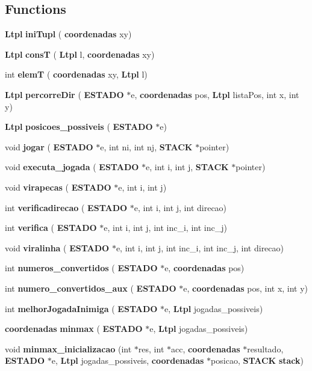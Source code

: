 \subsection*{Functions}
\begin{DoxyCompactItemize}
\item 
\textbf{ Ltpl} \textbf{ ini\+Tupl} (\textbf{ coordenadas} xy)
\item 
\textbf{ Ltpl} \textbf{ consT} (\textbf{ Ltpl} l, \textbf{ coordenadas} xy)
\item 
int \textbf{ elemT} (\textbf{ coordenadas} xy, \textbf{ Ltpl} l)
\item 
\textbf{ Ltpl} \textbf{ percorre\+Dir} (\textbf{ E\+S\+T\+A\+DO} $\ast$e, \textbf{ coordenadas} pos, \textbf{ Ltpl} lista\+Pos, int x, int y)
\item 
\textbf{ Ltpl} \textbf{ posicoes\+\_\+possiveis} (\textbf{ E\+S\+T\+A\+DO} $\ast$e)
\item 
void \textbf{ jogar} (\textbf{ E\+S\+T\+A\+DO} $\ast$e, int ni, int nj, \textbf{ S\+T\+A\+CK} $\ast$pointer)
\item 
void \textbf{ executa\+\_\+jogada} (\textbf{ E\+S\+T\+A\+DO} $\ast$e, int i, int j, \textbf{ S\+T\+A\+CK} $\ast$pointer)
\item 
void \textbf{ virapecas} (\textbf{ E\+S\+T\+A\+DO} $\ast$e, int i, int j)
\item 
int \textbf{ verificadirecao} (\textbf{ E\+S\+T\+A\+DO} $\ast$e, int i, int j, int direcao)
\item 
int \textbf{ verifica} (\textbf{ E\+S\+T\+A\+DO} $\ast$e, int i, int j, int inc\+\_\+i, int inc\+\_\+j)
\item 
void \textbf{ viralinha} (\textbf{ E\+S\+T\+A\+DO} $\ast$e, int i, int j, int inc\+\_\+i, int inc\+\_\+j, int direcao)
\item 
int \textbf{ numeros\+\_\+convertidos} (\textbf{ E\+S\+T\+A\+DO} $\ast$e, \textbf{ coordenadas} pos)
\item 
int \textbf{ numero\+\_\+convertidos\+\_\+aux} (\textbf{ E\+S\+T\+A\+DO} $\ast$e, \textbf{ coordenadas} pos, int x, int y)
\item 
int \textbf{ melhor\+Jogada\+Inimiga} (\textbf{ E\+S\+T\+A\+DO} $\ast$e, \textbf{ Ltpl} jogadas\+\_\+possiveis)
\item 
\textbf{ coordenadas} \textbf{ minmax} (\textbf{ E\+S\+T\+A\+DO} $\ast$e, \textbf{ Ltpl} jogadas\+\_\+possiveis)
\item 
void \textbf{ minmax\+\_\+inicializacao} (int $\ast$res, int $\ast$acc, \textbf{ coordenadas} $\ast$resultado, \textbf{ E\+S\+T\+A\+DO} $\ast$e, \textbf{ Ltpl} jogadas\+\_\+possiveis, \textbf{ coordenadas} $\ast$posicao, \textbf{ S\+T\+A\+CK} \textbf{ stack})

\end{DoxyCompactItemize}
